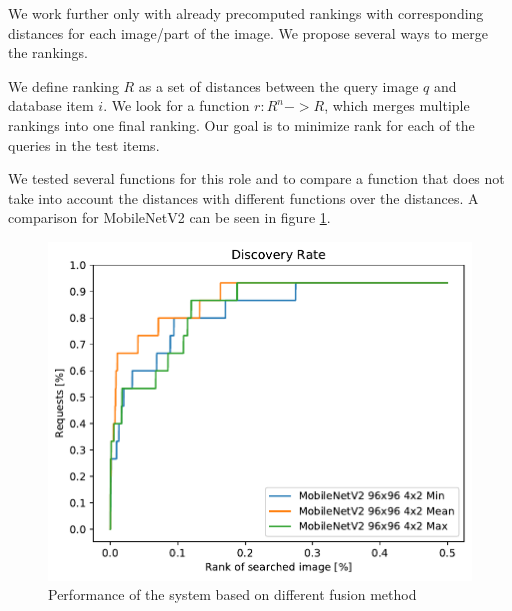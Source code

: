 We work further only with already precomputed rankings with corresponding distances for each image/part of the image. We propose several ways to merge the rankings.

We define ranking $R$ as a set of distances between the query image $q$ and database item $i$. We look for a function \(r: R^n -> R\), which merges multiple rankings into one final ranking. Our goal is to minimize rank for each of the queries in the test items.

We tested several functions for this role and to compare a function that does not take into account the distances with different functions over the distances. A comparison for MobileNetV2 can be seen in figure \ref{fig:ranking_funcs}.

\begin{figure}
\centering
\includegraphics[width=\textwidth]{graphs/362cb9a687ce05c7732f973defca88fb8c5c393f5992066521343314698c9de7}
\caption{Performance of the system based on different fusion method}
\label{fig:ranking_funcs}
\end{figure}





